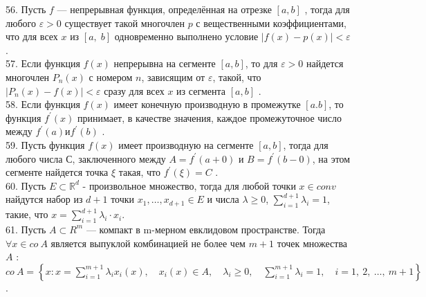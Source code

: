 \documentclass[12pt]{article}
\begin{document}
{{56. Пусть ${\displaystyle f}$ — непрерывная функция, определённая на отрезке ${\displaystyle [a,b]}$ , тогда для любого ${\displaystyle \varepsilon >0}$ существует такой многочлен ${\displaystyle p}$  с вещественными коэффициентами, что для всех ${\displaystyle x}$  из ${\displaystyle [a,\;b]}$ одновременно выполнено условие ${\displaystyle |f(x)-p(x)|<\varepsilon }$ .\\

57. Если функция ${\displaystyle f(x)}$ непрерывна на сегменте ${\displaystyle [a,b]}$, то для ${\displaystyle \varepsilon>0}$ найдется многочлен ${\displaystyle P_n(x)}$ с номером ${\displaystyle n}$, зависящим от ${\displaystyle \varepsilon}$, такой, что ${\displaystyle |P_n(x)-f(x)|<\varepsilon}$ сразу для всех ${\displaystyle x}$ из сегмента ${\displaystyle [a,b]}$ .\\

58. Если функция ${\displaystyle f(x)}$ имеет конечную производную в промежутке ${\displaystyle [a.b]}$, то функция ${\displaystyle f^{\prime}(x)}$ принимает, в качестве значения, каждое промежуточное число между ${\displaystyle f^{\prime}(a) и \displaystyle f^{\prime}(b)}$ .\\

59. Пусть функция ${\displaystyle f(x)}$ имеет производную на сегменте ${\displaystyle [a,b]}$, тогда для любого числа ${\displaystyle С}$, заключенного между ${\displaystyle A=f^{\prime}(a+0)}$ и ${\displaystyle B=f^{\prime}(b-0)}$, на этом сегменте найдется точка ${\displaystyle \xi}$ такая, что ${\displaystyle f^{\prime}(\xi)=C}$ .\\

60. Пусть ${\displaystyle E \subset \mathbb{R}^d}$ - произвольное множество, тогда для любой точки ${\displaystyle x \in conv}$ найдутся набор из ${\displaystyle d+1}$ точки ${\displaystyle x_1,\ldots,x_{d+1} \in E}$ и числа ${\displaystyle \lambda \geq 0}$, ${\sum \limits _{i=1}^{d+1} \lambda_i=1}$, такие, что ${\displaystyle  x=\sum \limits _{i=1}^{d+1} \lambda_i\cdot x_i}$.\\

61. Пусть ${\displaystyle A\subset R^{m}}$  — компакт в m-мерном евклидовом пространстве. Тогда ${\displaystyle \forall x\in co\ A}$ является выпуклой комбинацией не более чем ${\displaystyle m + 1}$ точек множества ${\displaystyle A}$ : ${\displaystyle co\ A=\left\{x:x=\sum _{i=1}^{m+1}\lambda _{i}x_{i}(x),\quad x_{i}(x)\in A,\quad \lambda _{i}\geqslant 0,\quad \sum _{i=1}^{m+1}\lambda _{i}=1,\quad i=1,\ 2,\ \dots ,\ m+1\right\}}$ .\\

}}
\end{document}
